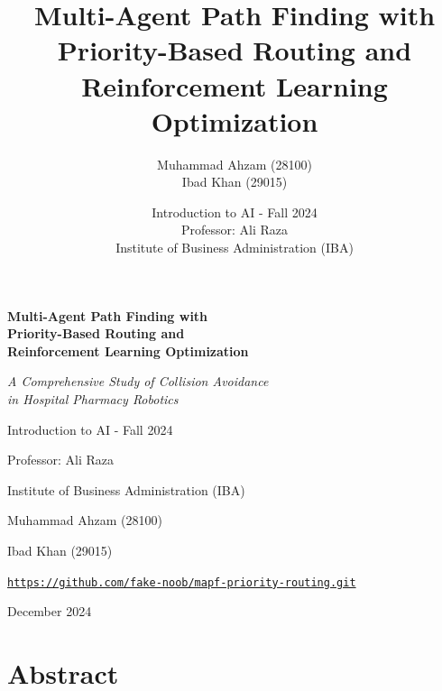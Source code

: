 \documentclass[12pt, a4paper]{report}
\title{Multi-Agent Path Finding with Priority-Based Routing and Reinforcement Learning Optimization}
\author{Muhammad Ahzam (28100) \\ Ibad Khan (29015)}
\date{Introduction to AI - Fall 2024 \\ Professor: Ali Raza \\ Institute of Business Administration (IBA)}
\newcommand{\githublink}[1]{\href{#1}{\texttt{#1}}}
\begin{document}
\begin{titlepage}
    \centering
    \vspace*{2cm}
    
    {\huge\bfseries Multi-Agent Path Finding with\\ Priority-Based Routing and\\ Reinforcement Learning Optimization\par}
    
    \vspace{2cm}
    
    {\Large\itshape A Comprehensive Study of Collision Avoidance\\ in Hospital Pharmacy Robotics\par}
    
    \vspace{3cm}
    
    {\large Introduction to AI - Fall 2024\par}
    \vspace{0.5cm}
    {\large Professor: Ali Raza\par}
    \vspace{0.5cm}
    {\large Institute of Business Administration (IBA)\par}
    
    \vspace{3cm}
    
    {\large Muhammad Ahzam (28100)\par}
    {\large Ibad Khan (29015)\par}
    
    \vspace{2cm}
    
    {\large \githublink{https://github.com/fake-noob/mapf-priority-routing.git}\par}
    
    \vfill
    
    {\large December 2024\par}
\end{titlepage}

\tableofcontents
\newpage

\listoftables
\listoffigures
\newpage

\chapter*{Abstract}
\end{document}
